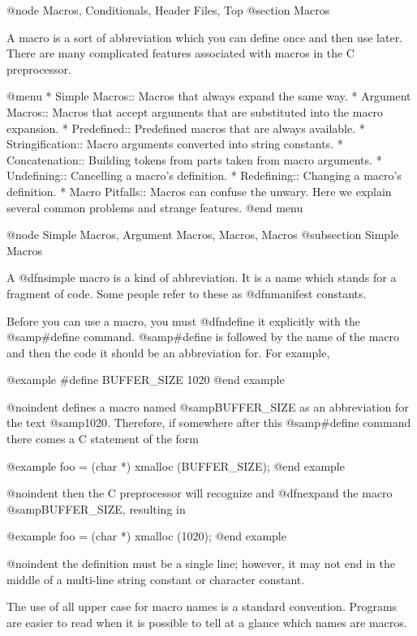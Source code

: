 {@node Macros, Conditionals, Header Files, Top
@section Macros

A macro is a sort of abbreviation which you can define once and then
use later.  There are many complicated features associated with macros
in the C preprocessor.

@menu
* Simple Macros::    Macros that always expand the same way.
* Argument Macros::  Macros that accept arguments that are substituted
                       into the macro expansion.
* Predefined::       Predefined macros that are always available.
* Stringification::  Macro arguments converted into string constants.
* Concatenation::    Building tokens from parts taken from macro arguments.
* Undefining::       Cancelling a macro's definition.
* Redefining::       Changing a macro's definition.
* Macro Pitfalls::   Macros can confuse the unwary.  Here we explain
                       several common problems and strange features.
@end menu

@node Simple Macros, Argument Macros, Macros, Macros
@subsection Simple Macros

A @dfn{simple macro} is a kind of abbreviation.  It is a name which
stands for a fragment of code.  Some people refer to these as
@dfn{manifest constants}.

Before you can use a macro, you must @dfn{define} it explicitly with the
@samp{#define} command.  @samp{#define} is followed by the name of the
macro and then the code it should be an abbreviation for.  For example,

@example
#define BUFFER_SIZE 1020
@end example

@noindent
defines a macro named @samp{BUFFER_SIZE} as an abbreviation for the text
@samp{1020}.  Therefore, if somewhere after this @samp{#define} command
there comes a C statement of the form

@example
foo = (char *) xmalloc (BUFFER_SIZE);
@end example

@noindent
then the C preprocessor will recognize and @dfn{expand} the macro
@samp{BUFFER_SIZE}, resulting in

@example
foo = (char *) xmalloc (1020);
@end example

@noindent
the definition must be a single line; however, it may not end in the
middle of a multi-line string constant or character constant.

The use of all upper case for macro names is a standard convention.
Programs are easier to read when it is possible to tell at a glance which
names are macros.

}
